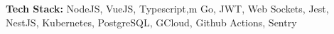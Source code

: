\documentclass[]{resume}
\begin{document}
\begin{minipage}[t]{0.66\textwidth}
\begin{tightemize}
\item {\bf Tech Stack:} NodeJS, VueJS, Typescript,m Go, JWT, Web Sockets, Jest, NestJS, Kubernetes, PostgreSQL, GCloud, Github Actions, Sentry\newline
\end{tightemize}

\end{minipage}
\end{document}
